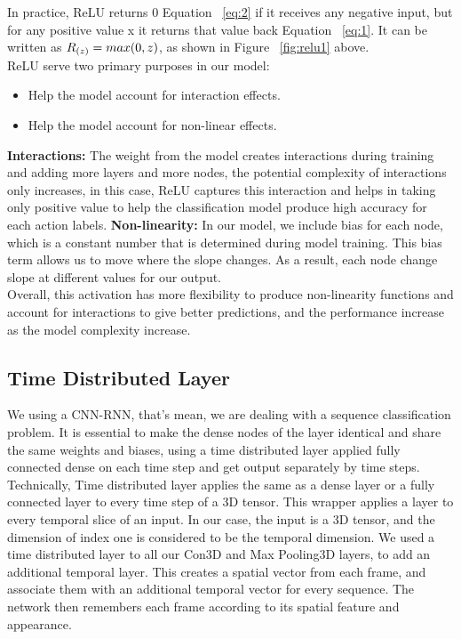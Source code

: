 In practice, ReLU returns 0 Equation ~\ref{eq:2} if it receives any negative input, but for any positive value x it returns that value back Equation ~\ref{eq:1}. It can be written as $\large R_{(z)}=max(0,z)$, as shown in Figure ~\ref{fig:relu1} above.\\

ReLU serve two primary purposes in our model:
\begin{itemize}
    \item Help the model account for interaction effects.
    \item Help the model account for non-linear effects.
\end{itemize}
\textbf{Interactions:} The weight from the model creates interactions during training and adding more layers and more nodes, the potential complexity of interactions only increases, in this case, ReLU captures this interaction and helps in taking only positive value to help the classification model produce high accuracy for each action labels.
\textbf{Non-linearity:} In our model, we include bias for each node, which is a constant number that is determined during model training. This bias term allows us to move where the slope changes. As a result, each node change slope at different values for our output.\\

Overall, this activation has more flexibility to produce non-linearity functions and account for interactions to give better predictions, and the performance increase as the model complexity increase.

\subsection{Time Distributed Layer}
We using a CNN-RNN, that's mean, we are dealing with a sequence classification problem. It is essential to make the dense nodes of the layer identical and share the same weights and biases, using a time distributed layer applied fully connected dense on each time step and get output separately by time steps.\\

Technically, Time distributed layer applies the same as a dense layer or a fully connected layer to every time step of a 3D tensor. This wrapper applies a layer to every temporal slice of an input. In our case, the input is a 3D tensor, and the dimension of index one is considered to be the temporal dimension. We used a time distributed layer to all our Con3D and Max Pooling3D layers, to add an additional temporal layer. This creates a spatial vector from each frame, and associate them with an additional temporal vector for every sequence. The network then remembers each frame according to its spatial feature and appearance.

